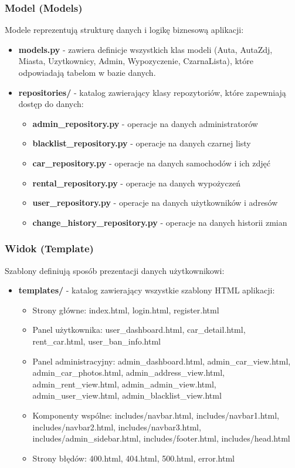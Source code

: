 \documentclass[12pt,a4paper]{article}
\begin{document}
\subsubsection{Model (Models)}
Modele reprezentują strukturę danych i logikę biznesową aplikacji:
\begin{itemize}
    \item \textbf{models.py} - zawiera definicje wszystkich klas modeli (Auta, AutaZdj, Miasta, Uzytkownicy, Admin, Wypozyczenie, CzarnaLista), które odpowiadają tabelom w bazie danych.
    \item \textbf{repositories/} - katalog zawierający klasy repozytoriów, które zapewniają dostęp do danych:
    \begin{itemize}
        \item \textbf{admin\_repository.py} - operacje na danych administratorów
        \item \textbf{blacklist\_repository.py} - operacje na danych czarnej listy
        \item \textbf{car\_repository.py} - operacje na danych samochodów i ich zdjęć
        \item \textbf{rental\_repository.py} - operacje na danych wypożyczeń
        \item \textbf{user\_repository.py} - operacje na danych użytkowników i adresów
        \item \textbf{change\_history\_repository.py} - operacje na danych historii zmian
    \end{itemize}
\end{itemize}

\subsubsection{Widok (Template)}
Szablony definiują sposób prezentacji danych użytkownikowi:
\begin{itemize}
    \item \textbf{templates/} - katalog zawierający wszystkie szablony HTML aplikacji:
    \begin{itemize}
        \item Strony główne: index.html, login.html, register.html
        \item Panel użytkownika: user\_dashboard.html, car\_detail.html, rent\_car.html, user\_ban\_info.html
        \item Panel administracyjny: admin\_dashboard.html, admin\_car\_view.html, admin\_car\_photos.html, admin\_address\_view.html, admin\_rent\_view.html, admin\_admin\_view.html, admin\_user\_view.html, admin\_blacklist\_view.html
        \item Komponenty wspólne: includes/navbar.html, includes/navbar1.html, includes/navbar2.html, includes/navbar3.html, includes/admin\_sidebar.html, includes/footer.html, includes/head.html
        \item Strony błędów: 400.html, 404.html, 500.html, error.html
    \end{itemize}
\end{itemize}
\end{document}
